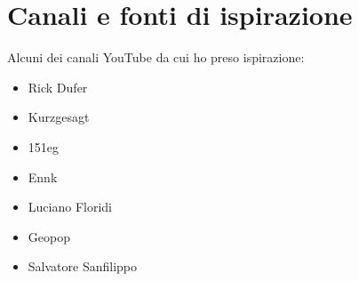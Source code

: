 
\chapter*{Canali e fonti di ispirazione}

Alcuni dei canali YouTube da cui ho preso ispirazione:

\begin{itemize}
	\item Rick Dufer
	\item Kurzgesagt
	\item 151eg
	\item Ennk
	\item Luciano Floridi
	\item Geopop
	\item Salvatore Sanfilippo
\end{itemize}
